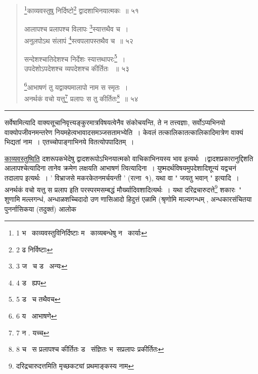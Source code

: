 \documentclass[11pt, openany]{book}
\begin{document}
{\newpage

\begin{quote}
 {\na \renewcommand{\thefootnote}{1}\footnote{1 भ \textendash\ काव्यवस्तुविनिर्दिष्टाः म \textendash\ काव्यबन्धेषु न \textendash\ कार्याः }काव्यवस्तुषु निर्दिष्टो\renewcommand{\thefootnote}{2}\footnote{2 ढ निर्विष्टाः } द्वादशाभिनयात्मकः~॥ ५१ 

आलापश्च प्रलापश्च विलापः \renewcommand{\thefootnote}{3}\footnote{3 ज \textendash\ च ड \textendash\ अन्यः }स्यात्तथैव च~।\\ 
अनुलपोऽथ संलापं \renewcommand{\thefootnote}{4}\footnote{4 ड \textendash\ ह्यप }स्त्वपलापस्तथैव च~॥ ५२ 

सन्देशश्चातिदेशश्च निर्देशः स्यात्तथापरः\renewcommand{\thefootnote}{5}\footnote{5 ड \textendash\ च तथैवच}~। \\
उपदेशोऽपदेशश्च व्यपदेशश्च कीर्तितः ~॥ ५३ 

\renewcommand{\thefootnote}{6}\footnote{6 य \textendash\ आभाषणे }आभाषणं तु यद्वाक्यमालापो नाम स स्मृतः~।\\ 
अनर्थकं वचो यत्तु\renewcommand{\thefootnote}{7}\footnote{7 न . यच्च} प्रलापः स तु कीर्तितः\renewcommand{\thefootnote}{8}\footnote{8 च \textendash\ स प्रलापश्च कीर्तितः ड \textendash\ संज्ञितः भ\textendash\ सप्रलापः प्रकीर्तितः}~॥ ५४ }
\end{quote}

\hrule

\vspace{2mm}

\noindent
सर्वेषामित्यादि वाक्यसूचानिवृत्त्यङ्कुरमात्रविषयत्वेनैव संकोचयन्ति, ते न तत्त्वज्ञाः, सर्वोऽप्यभिनयो वाक्योपजीवनमन्तरेण नियमहेत्वभावादसमञ्जसतामभ्येति~। केवलं तत्कालिकातत्कालिकादिमात्रेण वाक्यं भिद्यतां नाम~। एतच्चोपाङ्गाभिनये वितत्योपपादितम्~। 

\underline{काव्यवस्तुष्विति} दशरूपकभेदेषु द्वादशरूपोऽभिनयात्मको वाचिकाभिनयस्य भाव इत्यर्थः~।द्वादशप्रकारानुद्दिशति आलापश्चेत्यादिना तानेव क्रमेण लक्षयति आभाषणं त्वित्यादिना~। युष्मदर्थविषयमुपदेशादिशून्यं यद्वचनं तदालाप इत्यर्थः~। ' विभ्राजसे मकरकेतनमर्चयन्ती ' (रत्ना\textendash\ १), यथा वा " जयतु भवान् " इत्यादि~। अनर्थकं वचो यत्तु स प्रलाप इति परस्परमसम्बद्धं मौर्ख्यादिवशादित्यर्थः~। यथा दरिद्रचारुदत्ते\renewcommand{\thefootnote}{*}\footnote{ दरिद्रचारुदत्तमिति मृच्छकट्यां प्रथमाङ्कस्य नाम } शकारः\textendash\ " शुणामि मल्लगन्धं, अन्धाळशच्चिदादो उण णासिआदो हिदुत्तं एळामि (श्रृणोमि माल्यगन्धम् , अन्धकारसंचितया पुनर्नासिकया (तदुक्तं) आलोक\textendash\ 

\newpage

}
\end{document}
